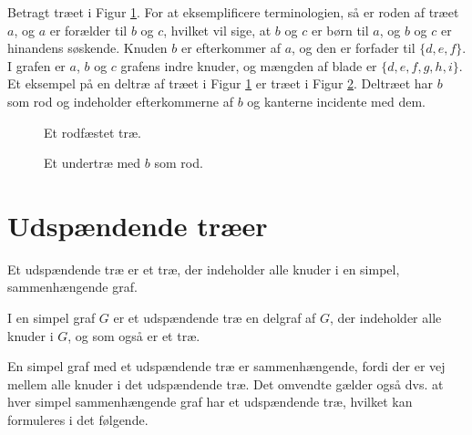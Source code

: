 \begin{exmp}
Betragt træet i Figur \ref{eksempel_rootedtree}. 
For at eksemplificere terminologien, så er roden af træet $a$, og $a$ er forælder til $b$ og $c$, hvilket vil sige, at $b$ og $c$ er børn til $a$, og $b$ og $c$ er hinandens søskende. 
Knuden $b$ er efterkommer af $a$, og den er forfader til $\lbrace d, e, f \rbrace$. 
I grafen er $a$, $b$ og $c$ grafens indre knuder, og mængden af blade er $\lbrace d, e, f, g, h, i \rbrace$. 
Et eksempel på en deltræ af træet i Figur \ref{eksempel_rootedtree} er træet i Figur \ref{eksempel_rootedsubtree}.
Deltræet har $b$ som rod og indeholder efterkommerne af $b$ og kanterne incidente med dem. 
\end{exmp}

\begin{figure}[h]
\centering
{}
\caption{Et rodfæstet træ.} 
\label{eksempel_rootedtree}
\end{figure}

\begin{figure}[h]
\centering
{}
\caption{Et undertræ med $b$ som rod.} 
\label{eksempel_rootedsubtree}
\end{figure}

\section{Udspændende træer}

Et udspændende træ er et træ, der indeholder alle knuder i en simpel, sammenhængende graf.

\begin{defn}
I en simpel graf $G$ er et udspændende træ en delgraf af $G$, der indeholder alle knuder i $G$, og som også er et træ.
\end{defn}

En simpel graf med et udspændende træ er sammenhængende, fordi der er vej mellem alle knuder i det udspændende træ.
Det omvendte gælder også dvs. at hver simpel sammenhængende graf har et udspændende træ, hvilket kan formuleres i det følgende.

